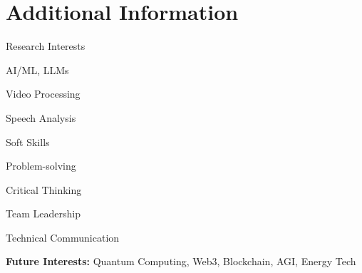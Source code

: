 \documentclass[10pt, letterpaper]{article}
\begin{document}
\section{Additional Information}
\begin{minipage}{\linewidth}
\begin{multicols}{2}
    \begin{skillsection}{Research Interests}
        \item AI/ML, LLMs
        \item Video Processing
        \item Speech Analysis
    \end{skillsection}
    
    \columnbreak

    \begin{skillsection}{Soft Skills}
        \item Problem-solving
        \item Critical Thinking
        \item Team Leadership
        \item Technical Communication
    \end{skillsection}
\end{multicols}

\textbf{Future Interests:} Quantum Computing, Web3, Blockchain, AGI, Energy Tech
\end{minipage}
\end{document}
